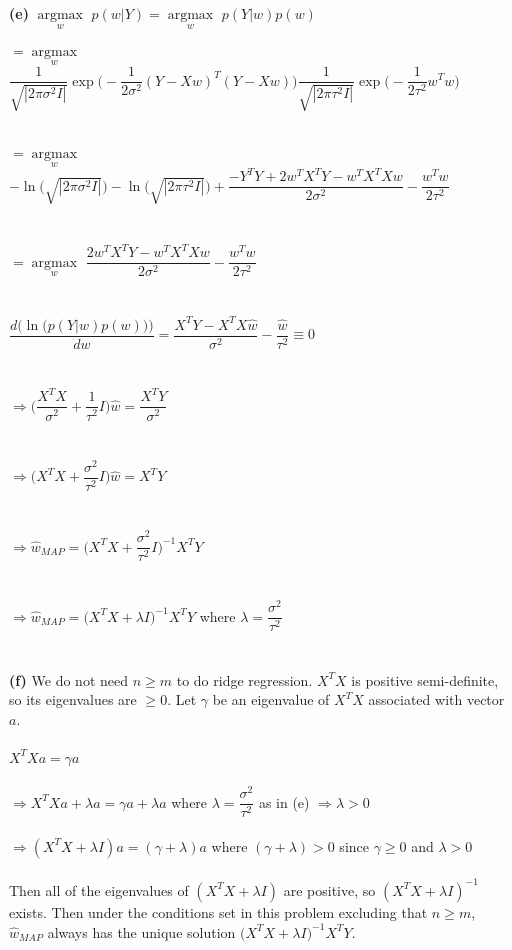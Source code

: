 \documentclass[submit]{harvardml}
\begin{document}
\textbf{(e)} $\underset{w}{\operatorname{argmax}}$ $p(w|Y)=\underset{w}{\operatorname{argmax}}$ $p(Y|w)p(w)$\\\\
$=\underset{w}{\operatorname{argmax}}$ $\dfrac{1}{\sqrt{|2\pi\sigma^2I|}}\exp\Bigg(-\dfrac{1}{2\sigma^2}(Y-Xw)^T(Y-Xw)\Bigg)\dfrac{1}{\sqrt{|2\pi\tau^2I|}}\exp\Bigg(-\dfrac{1}{2\tau^2}w^Tw\Bigg)$\\\\\\
$=\underset{w}{\operatorname{argmax}}$ $-\ln\big(\sqrt{|2\pi\sigma^2I|}\big)-\ln\big(\sqrt{|2\pi\tau^2I|}\big)+\dfrac{-Y^TY+2w^TX^TY-w^TX^TXw}{2\sigma^2}-\dfrac{w^Tw}{2\tau^2}$\\\\\\
$=\underset{w}{\operatorname{argmax}}$ $\dfrac{2w^TX^TY-w^TX^TXw}{2\sigma^2}-\dfrac{w^Tw}{2\tau^2}$\\\\\\
$\dfrac{d\Big(\ln\big(p(Y|w)p(w)\big)\Big)}{dw}=\dfrac{X^TY-X^TX\hat w}{\sigma^2}-\dfrac{\hat w}{\tau^2}\equiv0$\\\\\\
$\Rightarrow\Bigg(\dfrac{X^TX}{\sigma^2}+\dfrac{1}{\tau^2}I\Bigg)\hat w=\dfrac{X^TY}{\sigma^2}$\\\\\\
$\Rightarrow\Bigg(X^TX+\dfrac{\sigma^2}{\tau^2}I\Bigg)\hat w=X^TY$\\\\\\
$\Rightarrow\hat w_{MAP}=\Bigg(X^TX+\dfrac{\sigma^2}{\tau^2}I\Bigg)^{-1}X^TY$\\\\\\
$\Rightarrow\hat w_{MAP}=\Big(X^TX+\lambda I\Big)^{-1}X^TY$ where $\lambda=\dfrac{\sigma^2}{\tau^2}$\\\\\\

\textbf{(f)} We do not need $n\geq m$ to do ridge regression. $X^TX$ is positive semi-definite, so its eigenvalues are $\geq 0$. Let $\gamma$ be an eigenvalue of $X^TX$ associated with vector $a$.\\\\
$X^TXa=\gamma a$\\\\
$\Rightarrow X^TXa+\lambda a=\gamma a+\lambda a$ where $\lambda=\dfrac{\sigma^2}{\tau^2}$ as in (e) $\Rightarrow\lambda>0$\\\\
$\Rightarrow (X^TX+\lambda I)a=(\gamma+\lambda)a$ where $(\gamma+\lambda)>0$ since $\gamma\geq0$ and $\lambda>0$\\\\
Then all of the eigenvalues of $(X^TX+\lambda I)$ are positive, so $(X^TX+\lambda I)^{-1}$ exists. Then under the conditions set in this problem excluding that $n\geq m$, $\hat w_{MAP}$ always has the unique solution $\big(X^TX+\lambda I\big)^{-1}X^TY$.\\\\\\
\end{document}
